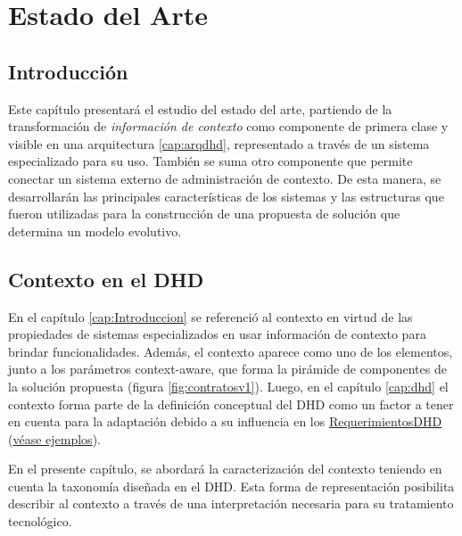 \chapter{Estado del Arte} \label{cap:estadodelarte} \label{cap:3}


\section{Introducción}

Este capítulo presentará el estudio del estado del arte, partiendo de
la transformación de \textit{información de contexto} como componente de primera clase y visible en una arquitectura \ref{cap:arqdhd}, representado a través de un sistema especializado para su uso. También se suma otro componente que permite conectar un sistema externo de administración de contexto.
De esta manera, se desarrollarán las principales características de los sistemas y las estructuras que fueron utilizadas para la construcción de una propuesta de solución que determina un modelo evolutivo. 



\section{Contexto en el DHD}

En el capítulo \ref{cap:Introduccion} se referenció al contexto en
virtud de las propiedades de sistemas especializados en usar información
de contexto para brindar funcionalidades. Además, el contexto aparece como uno
de los elementos, junto a los parámetros context-aware, que forma la
pirámide de componentes de la solución propuesta (figura \ref{fig:contratosv1}).
Luego, en el capítulo \ref{cap:dhd} el contexto forma parte de la definición
conceptual del DHD como un factor a tener en cuenta para la adaptación debido a
su influencia en los \hyperref[requerimientosdhd]{RequerimientosDHD}
(\hyperref[ejemplo1]{véase ejemplos}). 

En el presente capítulo, se abordará la caracterización del contexto teniendo en cuenta la taxonomía diseñada en el DHD. Esta forma de representación posibilita describir al contexto a través de una interpretación necesaria para su tratamiento tecnológico.


